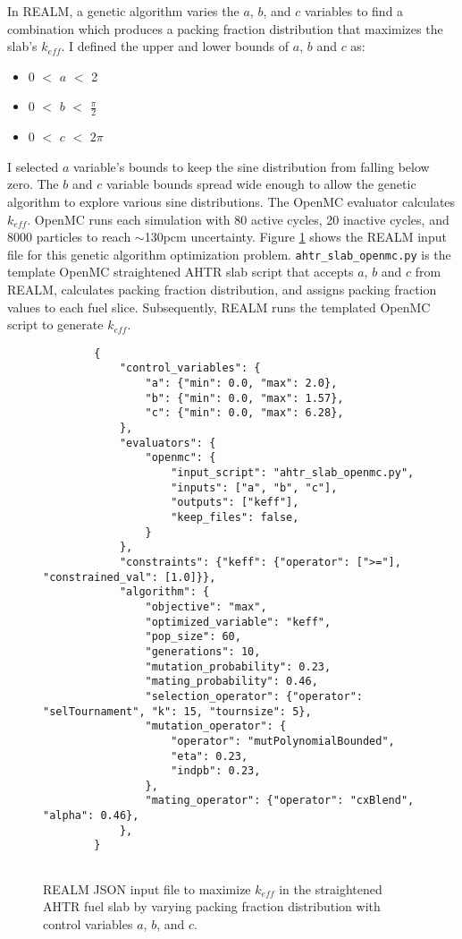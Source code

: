 In \gls{REALM}, a genetic algorithm varies the $a$, $b$, and $c$ variables to 
find a combination which produces a packing fraction distribution that maximizes 
the slab's $k_{eff}$. 
I defined the upper and lower bounds of $a$, $b$ and $c$ as: 
\begin{itemize}
    \item 0 $<$ $a$ $<$ 2 
    \item 0 $<$ $b$ $<$ $\frac{\pi}{2}$
    \item 0 $<$ $c$ $<$ $2\pi$
\end{itemize}
I selected $a$ variable's bounds to keep the sine distribution from falling 
below zero. 
The $b$ and $c$ variable bounds spread wide enough to allow the genetic 
algorithm to explore various sine distributions. 
The OpenMC evaluator calculates $k_{eff}$. 
OpenMC runs each simulation with 80 active cycles, 20 inactive cycles, and 
8000 particles to reach $\sim$130pcm uncertainty. 
Figure \ref{fig:realm-input-simple} shows the \gls{REALM} input file for this 
genetic algorithm optimization problem. 
\texttt{ahtr\_slab\_openmc.py} is the template OpenMC straightened \gls{AHTR} 
slab script that accepts $a$, $b$ and $c$ from \gls{REALM}, calculates packing 
fraction distribution, and assigns packing fraction values to each fuel slice. 
Subsequently, \gls{REALM} runs the templated OpenMC script to generate $k_{eff}$. 
\begin{figure}[]
    \begin{verbatim}
        {
            "control_variables": {
                "a": {"min": 0.0, "max": 2.0},
                "b": {"min": 0.0, "max": 1.57},
                "c": {"min": 0.0, "max": 6.28},
            },
            "evaluators": {
                "openmc": {
                    "input_script": "ahtr_slab_openmc.py",
                    "inputs": ["a", "b", "c"],
                    "outputs": ["keff"],
                    "keep_files": false,
                }
            },
            "constraints": {"keff": {"operator": [">="], "constrained_val": [1.0]}},
            "algorithm": {
                "objective": "max",
                "optimized_variable": "keff",
                "pop_size": 60,
                "generations": 10,
                "mutation_probability": 0.23,
                "mating_probability": 0.46,
                "selection_operator": {"operator": "selTournament", "k": 15, "tournsize": 5},
                "mutation_operator": {
                    "operator": "mutPolynomialBounded",
                    "eta": 0.23,
                    "indpb": 0.23,
                },
                "mating_operator": {"operator": "cxBlend", "alpha": 0.46},
            },
        }
        
    \end{verbatim}
    \caption{\acrfull{REALM} JSON input file to maximize $k_{eff}$ in the 
    straightened \acrfull{AHTR} fuel slab by varying packing fraction distribution 
    with control variables $a$, $b$, and $c$.}
    \label{fig:realm-input-simple}
\end{figure}

